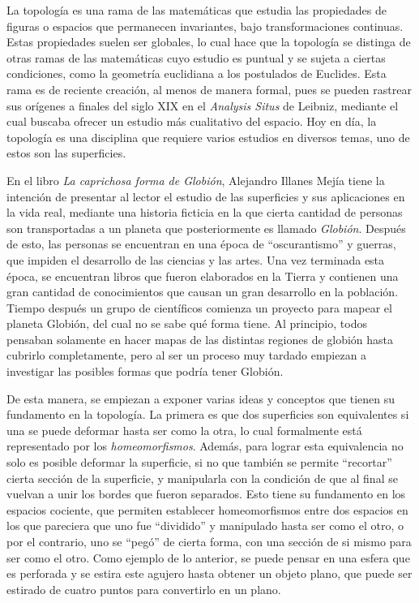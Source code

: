 \documentclass[12pt]{article}
\begin{document}
	\begin{multicols}{2}

		La topología es una rama de las matemáticas que estudia las propiedades de figuras o espacios que permanecen invariantes, bajo transformaciones continuas. Estas propiedades suelen ser globales, lo cual hace que la topología se distinga de otras ramas de las matemáticas cuyo estudio es puntual y se sujeta a ciertas condiciones, como la geometría euclidiana a los postulados de Euclides. Esta rama es de reciente creación, al menos de manera formal, pues se pueden rastrear sus orígenes a finales del siglo XIX en el \textit{Analysis Situs} de Leibniz, mediante el cual buscaba ofrecer un estudio más cualitativo del espacio. Hoy en día, la topología es una disciplina que requiere varios estudios en diversos temas, uno de estos son las superficies. 

		En el libro \textit{La caprichosa forma de Globión}, Alejandro Illanes Mejía tiene la intención de presentar al lector el estudio de las superficies y sus aplicaciones en la vida real, mediante una historia ficticia en la que cierta cantidad de personas son transportadas a un planeta que posteriormente es llamado \textit{Globión}. Después de esto, las personas se encuentran en una época de ``oscurantismo'' y guerras, que impiden el desarrollo de las ciencias y las artes. Una vez terminada esta época, se encuentran libros que fueron elaborados en la Tierra y contienen una gran cantidad de conocimientos que causan un gran desarrollo en la población. Tiempo después un grupo de científicos comienza un proyecto para mapear el planeta Globión, del cual no se sabe qué forma tiene. Al principio, todos pensaban solamente en hacer mapas de las distintas regiones de globión hasta cubrirlo completamente, pero al ser un proceso muy tardado empiezan a investigar las posibles formas que podría tener Globión.

		De esta manera, se empiezan a exponer varias ideas y conceptos que tienen su fundamento en la topología. La primera es que dos superficies son equivalentes si una se puede deformar hasta ser como la otra, lo cual formalmente está representado por los \textit{homeomorfismos}. Además, para lograr esta equivalencia no solo es posible deformar la superficie, si no que también se permite ``recortar'' cierta sección de la superficie, y manipularla con la condición de que al final se vuelvan a unir los bordes que fueron separados. Esto tiene su fundamento en los espacios cociente, que permiten establecer homeomorfismos entre dos espacios en los que pareciera que uno fue ``dividido'' y manipulado hasta ser como el otro, o por el contrario, uno se ``pegó'' de cierta forma, con una sección de si mismo para ser como el otro. Como ejemplo de lo anterior, se puede pensar en una esfera que es perforada y se estira este agujero hasta obtener un objeto plano, que puede ser estirado de cuatro puntos para convertirlo en un plano.


\end{multicols}
\end{document}

